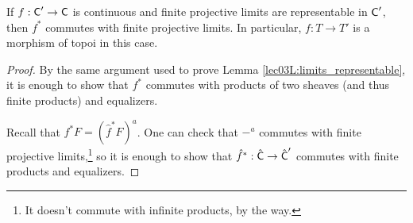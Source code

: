 
 \begin{theorem} \label{lec05T:CommWithFiniteProjLimits}
   If $f:\text{\sf C}'\to \text{\sf C}$ is continuous and finite projective limits are
   representable in $\text{\sf C}'$, then $f^*$ commutes with finite projective limits. In
   particular, $f:T\to T'$ is a morphism of topoi in this case.
 \end{theorem}
 \begin{proof}
   By the same argument used to prove Lemma \ref{lec03L:limits_representable}, it is
   enough to show that $f^*$ commutes with products of two sheaves (and thus finite
   products) and equalizers.


   Recall that $f^*F = (\hat f^* F)^a$. One can check that $-^a$ commutes with finite
   projective limits,\footnote{It doesn't commute with infinite products, by the way.} so
   it is enough to show that $\hat f^*:\hat {\text{\sf C}}\to \hat {\text{\sf C}}'$ commutes with finite products
   and equalizers.


\end{proof}
